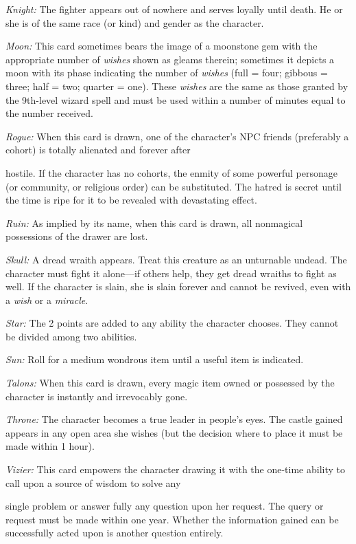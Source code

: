 \textit{Knight: }The fighter appears out of nowhere and serves loyally until death. 
He or she is of the same race (or kind) and gender as the character.

\textit{Moon: }This card sometimes bears the image of a moonstone gem with the 
appropriate number of \textit{wishes }shown as gleams therein; sometimes it depicts 
a moon with its phase indicating the number of \textit{wishes }(full = four; gibbous 
= three; half = two; quarter = one). These \textit{wishes }are the same as those 
granted by the 9th-level wizard spell and must be used within a number of minutes 
equal to the number received.

\textit{Rogue: }When this card is drawn, one of the character's NPC friends (preferably 
a cohort) is totally alienated and forever after

hostile. If the character has no cohorts, the enmity of some powerful personage 
(or community, or religious order) can be substituted. The hatred is secret until 
the time is ripe for it to be revealed with devastating effect.

\textit{Ruin: }As implied by its name, when this card is drawn, all nonmagical 
possessions of the drawer are lost.

\textit{Skull: }A dread wraith appears. Treat this creature as an unturnable undead. 
The character must fight it alone---if others help, they get dread wraiths to fight 
as well. If the character is slain, she is slain forever and cannot be revived, 
even with a \textit{wish }or a \textit{miracle}.

\textit{Star: }The 2 points are added to any ability the character chooses. They 
cannot be divided among two abilities. 

\textit{Sun: }Roll for a medium wondrous item until a useful item is indicated.

\textit{Talons: }When this card is drawn, every magic item owned or possessed by 
the character is instantly and irrevocably gone.

\textit{Throne: }The character becomes a true leader in people's eyes. The castle 
gained appears in any open area she wishes (but the decision where to place it 
must be made within 1 hour).

\textit{Vizier: }This card empowers the character drawing it with the one-time 
ability to call upon a source of wisdom to solve any

single problem or answer fully any question upon her request. The query or request 
must be made within one year. Whether the information gained can be successfully 
acted upon is another question entirely.

